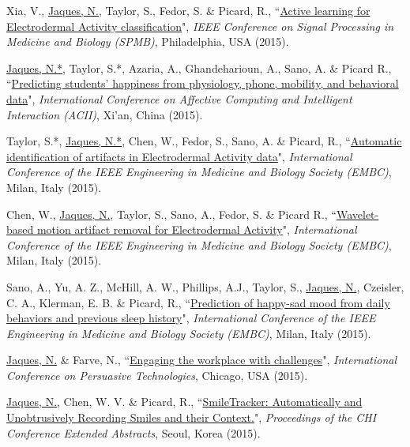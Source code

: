 \documentclass[paper=letter,fontsize=11pt]{scrartcl} %
\newcommand{\PaperEntry}[6]{
		\noindent #1, ``\href{#6}{#2}", \textit{#3}, #4 (#5).}
\begin{document}
\begin{etaremune}
\item \PaperEntry{Xia, V., \underline{Jaques, N.}, Taylor, S., Fedor, S. \& Picard, R.}{Active learning for Electrodermal Activity classification}{IEEE Conference on Signal Processing in Medicine and Biology (SPMB)}{Philadelphia, USA}{2015}{https://dspace.mit.edu/openaccess-disseminate/1721.1/109392}

\item \PaperEntry{\underline{Jaques, N.*}, Taylor, S.*, Azaria, A., Ghandeharioun, A., Sano, A. \& Picard R.}{Predicting students' happiness from physiology, phone, mobility, and behavioral data}{International Conference on Affective Computing and Intelligent Interaction (ACII)}{Xi'an, China}{2015}{https://www.ncbi.nlm.nih.gov/pmc/articles/PMC5431070/}

\item \PaperEntry{Taylor, S.*, \underline{Jaques, N.*}, Chen, W., Fedor, S., Sano, A. \& Picard, R.}{Automatic identification of artifacts in Electrodermal Activity data}{International Conference of the IEEE Engineering in Medicine and Biology Society (EMBC)}{Milan, Italy}{2015}{https://www.ncbi.nlm.nih.gov/pmc/articles/PMC5413200/}

\item \PaperEntry{Chen, W., \underline{Jaques, N.}, Taylor, S., Sano, A., Fedor, S. \& Picard R.}{Wavelet-based motion artifact removal for Electrodermal Activity}{International Conference of the IEEE Engineering in Medicine and Biology Society (EMBC)}{Milan, Italy}{2015}{https://www.ncbi.nlm.nih.gov/pmc/articles/PMC5413204/}

\item \PaperEntry{Sano, A., Yu, A. Z., McHill, A. W., Phillips, A.J., Taylor, S., \underline{Jaques, N.}, Czeisler, C. A., Klerman, E. B. \& Picard, R.}{Prediction of happy-sad mood from daily behaviors and previous sleep history}{International Conference of the IEEE Engineering in Medicine and Biology Society (EMBC)}{Milan, Italy}{2015}{https://www.ncbi.nlm.nih.gov/pmc/articles/PMC4768795/}

\item \PaperEntry{\underline{Jaques, N.} \& Farve, N.}{Engaging the workplace with challenges}{International Conference on Persuasive Technologies}{Chicago, USA}{2015}{https://drive.google.com/file/d/15Pimm1FwwxSPPX04KTr84ilVHJvVExPd/view?usp=sharing}

\item \PaperEntry{\underline{Jaques, N.}, Chen, W. V. \& Picard, R.}{SmileTracker: Automatically and Unobtrusively Recording Smiles and their Context.}{Proceedings of the CHI Conference Extended Abstracts}{Seoul, Korea}{2015}{https://www.media.mit.edu/publications/smiletracker-automatically-and-unobtrusively-recording-smiles-and-their-context/}


\end{etaremune}
\end{document}
